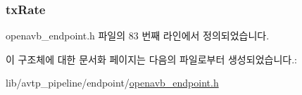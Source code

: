 \subsubsection[{\texorpdfstring{tx\+Rate}{txRate}}]{ tx\+Rate}\hypertarget{structopenavb_endpoint_params___talker_register__t_a348c4c50e96126b5b29920234ecae1e5}{}\label{structopenavb_endpoint_params___talker_register__t_a348c4c50e96126b5b29920234ecae1e5}


openavb\+\_\+endpoint.\+h 파일의 83 번째 라인에서 정의되었습니다.



이 구조체에 대한 문서화 페이지는 다음의 파일로부터 생성되었습니다.\+:\begin{DoxyCompactItemize}
\item 
lib/avtp\+\_\+pipeline/endpoint/\hyperlink{openavb__endpoint_8h}{openavb\+\_\+endpoint.\+h}\end{DoxyCompactItemize}
